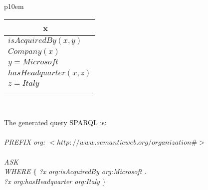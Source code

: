 \begin{enumerate}
\begin{itemize}
\begin{center}
\begin{tabular}{ p{10em} }
	\begin{center}
		\begin{tabular}{|c|l|}
			\hline
			\mbox{} & x \\ 
			\hline
			\multicolumn{2}{|l|}{
			$isAcquiredBy(x,y)$
			}\\
			\multicolumn{2}{|l|}{
			$Company(x)$
			}\\
			\multicolumn{2}{|l|}{
			$y=Microsoft$
			}\\
			\multicolumn{2}{|l|}{
			$hasHeadquarter(x,z)$
			}\\
			\multicolumn{2}{|l|}{
			$z=Italy$
			}\\
			\hline
			\multicolumn{2}{|l|}{
				\mbox{}
			} \\
			\hline
		\end{tabular}
	\end{center}	
	\\
\end{tabular}
\end{center}
\medskip
\end{itemize}
The generated query SPARQL is:
\\
\\
\textit{PREFIX org: $<http://www.semanticweb.org/organization \# >$}
\\
\\
\textit{ASK \\
\mbox{}\qquad WHERE $\{$ ?x org:isAcquiredBy org:Microsoft .\\
\mbox{}\qquad \qquad \qquad ?x org:hasHeadquarter org:Italy
\mbox{}\qquad $\}$ \\
}\\
\end{enumerate}